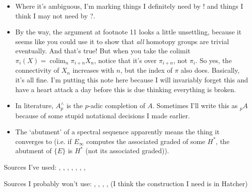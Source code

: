 \documentclass{MetricNotes2023}
\DeclareMathOperator{\colim}{colim}
\begin{document}
\begin{itemize}
\item Where it's ambiguous, I'm marking things I definitely need by ! and things I think I may not need by ?.

\item By the way, the argument at footnote 11 looks a little unsettling, because it seems like you could use it to show that \textit{all} homotopy groups are trivial eventually. And that's true! But when you take the colimit \(\pi_i(X)=\colim_n \pi_{i+n}X_n\), notice that it's over \(\pi_{i+n}\), not \(\pi_{i}\). So yes, the connectivity of \(X_n\) increases with \(n\), but the index of \(\pi\) also does. Basically, it's all fine. I'm putting this note here because I will invariably forget this and have a heart attack a day before this is due thinking everything is broken. 

\item In literature, \(A^\wedge_p\) is the \(p\)-adic completion of \(A\). Sometimes I'll write this as \(\text{}_pA\) because of some stupid notational decisions I made earlier.

\item The `abutment' of a spectral sequence apparently means the thing it converges to (i.e. if \(E_\infty\) computes the associated graded of some \(H^*\), the abutment of \(\{E\}\) is \(H^*\) (not its associated graded)). 
\end{itemize}

Sources I've used: \autocite{cobordism}, 
\autocite{ass}, \autocite{spectra}, \autocite{hatcher5}, \autocite{hatcher}, \autocite{rognes2}, \autocite{concise}, \autocite{spectral_sequences}

Sources I probably won't use: \autocite{suspension}, \autocite{stable_homotopy}, \autocite{foundations}, \autocite{primer}, \autocite{mazelgee} (I think the construction I need is in Hatcher)

\printbibliography
\end{document}
